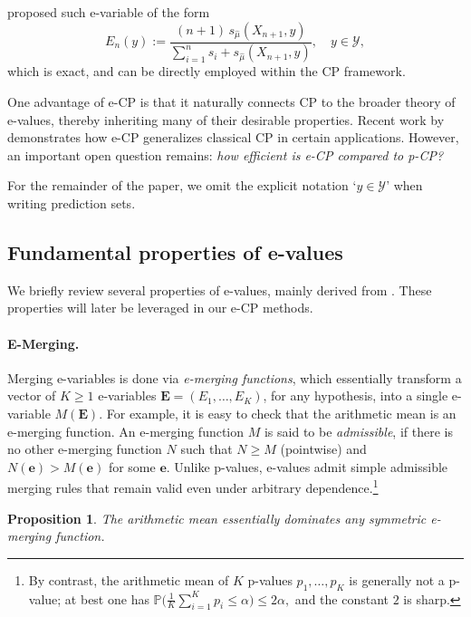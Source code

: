 \documentclass{article}
\theoremstyle{plain}
\newtheorem{proposition}[theorem]{Proposition}
\theoremstyle{definition}
\theoremstyle{remark}
\begin{document}
\citet{balinsky2024} proposed such e-variable of the form  
\begin{equation}\label{balinsky_evalue}
E_{n}(y)
:= \frac{(n+1)\,s_{\hat\mu}(X_{n+1},y)}
        {\sum_{i=1}^n s_i + s_{\hat\mu}(X_{n+1},y)},
\quad y \in \mathcal{Y},
\end{equation}
which is exact, and can be directly employed within the CP framework. 

One advantage of e-CP is that it naturally connects CP to the broader theory of e-values, thereby inheriting many of their desirable properties. Recent work by \citet{gauthier2025values,gauthier2025backward}  demonstrates how e-CP generalizes classical CP in certain applications. However, an important open question remains: \textit{how efficient is e-CP compared to p-CP?}

For the remainder of the paper, we omit the explicit notation `$y \in \mathcal{Y}$' when writing prediction sets.

\subsection{Fundamental properties of e-values}
\label{subsec:evals_prop}
We briefly review several properties of e-values, mainly derived from \citet{vovk2021values}. These properties will later be leveraged in our e-CP methods.

\paragraph{E-Merging.} 

Merging e-variables is done via \emph{e-merging functions}, which essentially transform a vector of $K \geq 1$ e-variables \(\mathbf{E}=(E_1,\ldots,E_K)\), for any hypothesis, into a single e-variable \(M(\mathbf{E})\). For example, it is easy to check that the arithmetic mean is an e-merging function. An e-merging function $M$ is said to be \emph{admissible}, if there is no other e-merging function $N$ such that $N \geq M$ (pointwise) and $N(\mathbf{e})>M(\mathbf{e})$ for some $\textbf{e}$. Unlike p-values, e-values admit simple admissible merging rules that remain valid even under arbitrary dependence.\footnote{By contrast, the arithmetic mean of $K$ p-values $p_1, \ldots, p_K$ is generally not a p-value; at best one has $\mathbb{P}\!\Big(\tfrac{1}{K}\sum_{i=1}^K p_i \le \alpha\Big) \le 2\alpha,$ and the constant $2$ is sharp.}

\begin{proposition}
\label{prop:sym_merg}
The arithmetic mean essentially dominates any symmetric e-merging function. 
\end{proposition}
\end{document}
